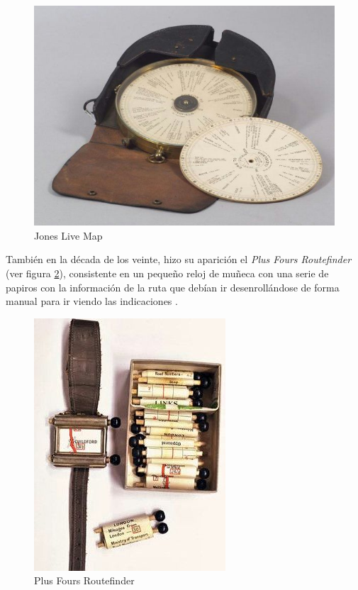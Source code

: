 \begin{figure}[h!btp]
\centering
\includegraphics[scale=0.5, fbox={\fboxrule} 4mm]{images/03-antecedentes/06-jones_live_map.png}
\caption{Jones Live Map}
\label{fig:jones_live_map}
\end{figure}

También en la década de los veinte, hizo su aparición el \textit{Plus Fours Routefinder} (ver figura \ref{fig:plus_fours_routefinder}), consistente en un pequeño reloj de muñeca con una serie de papiros con la información de la ruta que debían ir desenrollándose de forma manual para ir viendo las indicaciones \cite{Plus14}.

\begin{figure}[h!btp]
\centering
\includegraphics[scale=0.5, fbox={\fboxrule} 4mm]{images/03-antecedentes/07-plus_fours_routefinder.png}
\caption{Plus Fours Routefinder}
\label{fig:plus_fours_routefinder}
\end{figure}

